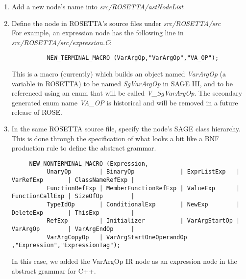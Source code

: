 \begin{enumerate}
     \item Add a new node's name into \textit{src/ROSETTA/astNodeList}
     \item Define the node in ROSETTA's source files under
     \textit{src/ROSETTA/src} \\
           For example, an expression node has the following line in
           \textit{src/ROSETTA/src/expression.C}:
{\indent
{\mySmallFontSize
\begin{verbatim}
          NEW_TERMINAL_MACRO (VarArgOp,"VarArgOp","VA_OP");
\end{verbatim}
}}
           This is a macro (currently) which builds an object named {\em VarArgOp} (a variable in
           ROSETTA) to be named {\em SgVarArgOp} in SAGE III, and to be referenced using an enum
           that will be called {\em V\_SgVarArgOp}.  The secondary generated enum name {\em VA\_OP}
           is historical and will be removed in a future release of ROSE.

     \item In the same ROSETTA source file, specify the node's SAGE class hierarchy. \\
           This is done through the specification of what looks a bit like a BNF
            production rule to define the abstract grammar. \\
{\indent
{\mySmallFontSize
\begin{verbatim}
     NEW_NONTERMINAL_MACRO (Expression,
          UnaryOp        | BinaryOp             | ExprListExp   | VarRefExp       | ClassNameRefExp |
          FunctionRefExp | MemberFunctionRefExp | ValueExp      | FunctionCallExp | SizeOfOp        |
          TypeIdOp       | ConditionalExp       | NewExp        | DeleteExp       | ThisExp         |
          RefExp         | Initializer          | VarArgStartOp | VarArgOp        | VarArgEndOp     |
          VarArgCopyOp   | VarArgStartOneOperandOp ,"Expression","ExpressionTag");
\end{verbatim} 
}}
        In this case, we added the VarArgOp IR node as an expression node in the
    abstract grammar for C++.


\end{enumerate}
